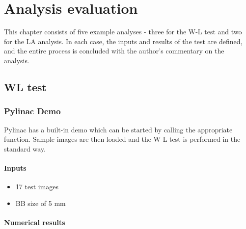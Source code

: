 \chapter{Analysis evaluation} \label{chr:analysisEvaluation}

This chapter consists of five example analyses - three for the W-L test and two for the LA analysis. In each case, the inputs and results of the test are defined, and the entire process is concluded with the author's commentary on the analysis. 

\section{WL test}

\subsection{Pylinac Demo}

Pylinac has a built-in demo which can be started by calling the appropriate function. Sample images are then loaded and the W-L test is performed in the standard way.

\subsubsection{Inputs}

\begin{itemize}
    \item 17 test images
    \item BB size of 5 mm
\end{itemize}

\subsubsection{Numerical results}

